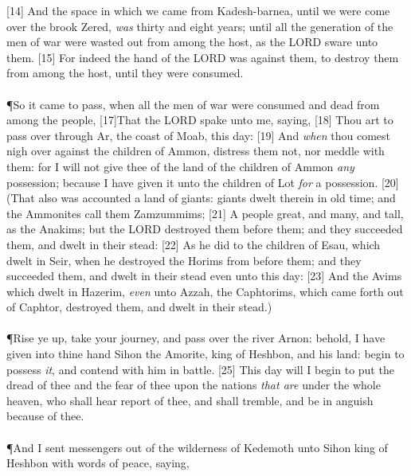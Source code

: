 [14] \textcolor[rgb]{0.00,0.00,1.00}{And the space in which we came from Kadesh-barnea, until we were come over the brook Zered, \emph{was} thirty and eight years; until all the generation of the men of war were wasted out from among the host, as the LORD sware unto them.}
[15] \textcolor[rgb]{0.00,0.00,1.00}{For indeed the hand of the LORD was against them, to destroy them from among the host, until they were consumed.}\\
\\
\P \textcolor[rgb]{0.00,0.00,1.00}{So it came to pass, when all the men of war were consumed and dead from among the people,}
[17]\textcolor[rgb]{0.00,0.00,1.00}{That the LORD spake unto me, saying,}
[18] \textcolor[rgb]{0.00,0.00,1.00}{Thou art to pass over through Ar, the coast of Moab, this day:}
[19] \textcolor[rgb]{0.00,0.00,1.00}{And \emph{when} thou comest nigh over against the children of Ammon, distress them not, nor meddle with them: for I will not give thee of the land of the children of Ammon \emph{any} possession; because I have given it unto the children of Lot \emph{for} a possession.}
[20] \textcolor[rgb]{0.00,0.00,1.00}{(That also was accounted a land of giants: giants dwelt therein in old time; and the Ammonites call them Zamzummims;}
[21] \textcolor[rgb]{0.00,0.00,1.00}{A people great, and many, and tall, as the Anakims; but the LORD destroyed them before them; and they succeeded them, and dwelt in their stead:}
[22] \textcolor[rgb]{0.00,0.00,1.00}{As he did to the children of Esau, which dwelt in Seir, when he destroyed the Horims from before them; and they succeeded them, and dwelt in their stead even unto this day:}
[23] \textcolor[rgb]{0.00,0.00,1.00}{And the Avims which dwelt in Hazerim, \emph{even} unto Azzah, the Caphtorims, which came forth out of Caphtor, destroyed them, and dwelt in their stead.)}\\
\\
\P \textcolor[rgb]{0.00,0.00,1.00}{Rise ye up, take your journey, and pass over the river Arnon: behold, I have given into thine hand Sihon the Amorite, king of Heshbon, and his land: begin to possess \emph{it}, and contend with him in battle.}
[25] \textcolor[rgb]{0.00,0.00,1.00}{This day will I begin to put the dread of thee and the fear of thee upon the nations \emph{that are} under the whole heaven, who shall hear report of thee, and shall tremble, and be in anguish because of thee.}\\
\\
\P \textcolor[rgb]{0.00,0.00,1.00}{And I sent messengers out of the wilderness of Kedemoth unto Sihon king of Heshbon with words of peace, saying,}
